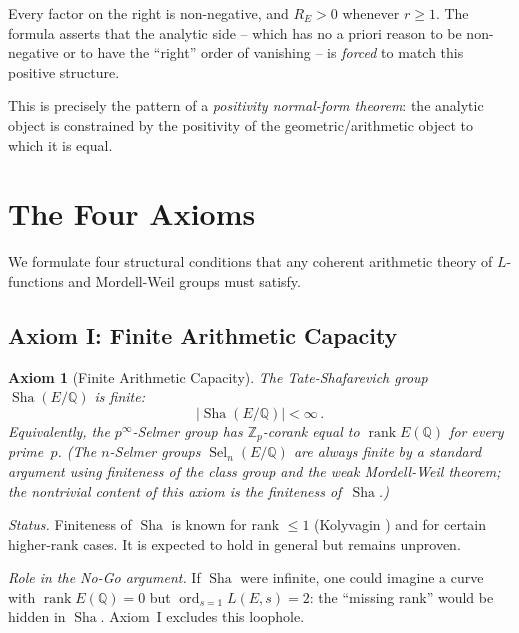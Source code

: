 \documentclass[aps,prd,twocolumn,superscriptaddress,nofootinbib]{revtex4-2}
\newtheorem{axiom}[theorem]{Axiom}
\theoremstyle{definition}
\theoremstyle{remark}
\DeclareMathOperator{\ord}{ord}
\DeclareMathOperator{\rank}{rank}
\DeclareMathOperator{\Sel}{Sel}
\DeclareMathOperator{\Sha}{Sha}
\begin{document}
Every factor on the right is non-negative, and $R_E > 0$ whenever $r \geq 1$. The formula asserts that the analytic side -- which has no a priori reason to be non-negative or to have the ``right'' order of vanishing -- is \textit{forced} to match this positive structure.

This is precisely the pattern of a \textit{positivity normal-form theorem}: the analytic object is constrained by the positivity of the geometric/arithmetic object to which it is equal.


\section{The Four Axioms}
\label{sec:axioms}

We formulate four structural conditions that any coherent arithmetic theory of $L$-functions and Mordell-Weil groups must satisfy.

\subsection{Axiom I: Finite Arithmetic Capacity}

\begin{axiom}[Finite Arithmetic Capacity]
\label{ax:finite}
The Tate-Shafarevich group $\Sha(E/\mathbb{Q})$ is finite:
\begin{equation}
|\Sha(E/\mathbb{Q})| < \infty\,.
\end{equation}
Equivalently, the $p^\infty$-Selmer group has $\mathbb{Z}_p$-corank equal to $\rank E(\mathbb{Q})$ for every prime~$p$. (The $n$-Selmer groups $\Sel_n(E/\mathbb{Q})$ are always finite by a standard argument using finiteness of the class group and the weak Mordell-Weil theorem; the nontrivial content of this axiom is the finiteness of~$\Sha$.)
\end{axiom}

\textit{Status.} Finiteness of $\Sha$ is known for rank $\leq 1$ (Kolyvagin \cite{Kolyvagin1990}) and for certain higher-rank cases. It is expected to hold in general but remains unproven.

\textit{Role in the No-Go argument.} If $\Sha$ were infinite, one could imagine a curve with $\rank E(\mathbb{Q}) = 0$ but $\ord_{s=1} L(E,s) = 2$: the ``missing rank'' would be hidden in $\Sha$. Axiom~I excludes this loophole.
\end{document}
